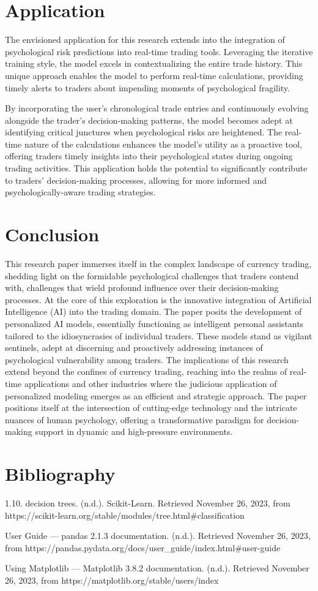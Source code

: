 \documentclass{article}
\begin{document}
\section{Application}
The envisioned application for this research extends into the integration of psychological risk predictions into real-time trading tools. Leveraging the iterative training style, the model excels in contextualizing the entire trade history. This unique approach enables the model to perform real-time calculations, providing timely alerts to traders about impending moments of psychological fragility.

By incorporating the user's chronological trade entries and continuously evolving alongside the trader's decision-making patterns, the model becomes adept at identifying critical junctures when psychological risks are heightened. The real-time nature of the calculations enhances the model's utility as a proactive tool, offering traders timely insights into their psychological states during ongoing trading activities. This application holds the potential to significantly contribute to traders' decision-making processes, allowing for more informed and psychologically-aware trading strategies.


\section{Conclusion}
This research paper immerses itself in the complex landscape of currency trading, shedding light on the formidable psychological challenges that traders contend with, challenges that wield profound influence over their decision-making processes. At the core of this exploration is the innovative integration of Artificial Intelligence (AI) into the trading domain. The paper posits the development of personalized AI models, essentially functioning as intelligent personal assistants tailored to the idiosyncrasies of individual traders. These models stand as vigilant sentinels, adept at discerning and proactively addressing instances of psychological vulnerability among traders. The implications of this research extend beyond the confines of currency trading, reaching into the realms of real-time applications and other industries where the judicious application of personalized modeling emerges as an efficient and strategic approach. The paper positions itself at the intersection of cutting-edge technology and the intricate nuances of human psychology, offering a transformative paradigm for decision-making support in dynamic and high-pressure environments.

\section{Bibliography}
1.10. decision trees. (n.d.). Scikit-Learn. Retrieved November 26, 2023, from https://scikit-learn.org/stable/modules/tree.html\#classification

User Guide — pandas 2.1.3 documentation. (n.d.). Retrieved November 26, 2023, from https://pandas.pydata.org/docs/user\_guide/index.html\#user-guide

Using Matplotlib — Matplotlib 3.8.2 documentation. (n.d.). Retrieved November 26, 2023, from https://matplotlib.org/stable/users/index
\end{document}

